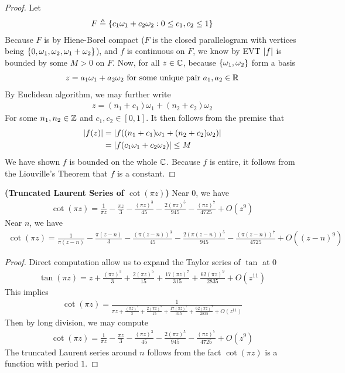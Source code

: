 \documentclass{report}
\begin{document}
\begin{proof}
Let 
\begin{align*}
F\triangleq  \{ c_1\omega_1+ c_2\omega_2: 0\leq c_1,c_2 \leq 1 \}
\end{align*}
Because $F$ is by Hiene-Borel compact ($F$ is the closed parallelogram with vertices being $\{ 0,\omega_1,\omega_2,\omega_1+\omega_2 \}$), and $f$ is continuous on $F$, we know by EVT $\left|f\right|$ is bounded  by some $M>0$ on  $F$. Now, for all $z\in\mathbb{C}$, because $\{ \omega_1,\omega_2 \}$ form a basis 
\begin{align*}
z=a_1\omega_1+a_2 \omega_2\text{ for some unique pair }a_1,a_2\in\mathbb{R}
\end{align*}
By Euclidean algorithm, we may further write 
\begin{align*}
z= (n_1+c_1)\omega_1 + (n_2+c_2)\omega_2
\end{align*}
For some $n_1,n_2 \in\mathbb{Z} $ and $c_1,c_2 \in [0,1]$. It then follows from the premise that 
\begin{align*}
  \left|f(z)\right|&=\left|f((n_1+c_1)\omega_1+ (n_2+c_2)\omega_2)\right| \\
             &=\left|f(c_1\omega_1+c_2\omega_2)\right|\leq M
\end{align*}
We have shown $f$ is bounded on the whole $\mathbb{C}$. Because $f$ is entire, it follows from the Liouville's Theorem that  $f$ is a constant.
\end{proof}
\begin{theorem}
\label{TL}
\textbf{(Truncated Laurent Series of $\cot (\pi  z)$)} Near $0$, we have 
\begin{align*}
\cot (\pi z)= \frac{1}{\pi  z}- \frac{\pi  z}{3}- \frac{(\pi  z)^3}{45}- \frac{2 (\pi z)^5}{945}- \frac{(\pi z)^7}{4725} + O(z^9)
\end{align*}
Near $n$, we have 
 \begin{align*}
\cot (\pi z)= \frac{1}{\pi (z-n)}- \frac{\pi  (z-n)}{3}- \frac{(\pi  (z-n))^3}{45}- \frac{2 (\pi (z-n))^5}{945}- \frac{(\pi (z-n))^7}{4725} + O((z-n)^9)
\end{align*}
\end{theorem}
\begin{proof}
Direct computation allow us to expand the Taylor series of $\tan$ at $0$ 
\begin{align*}
\tan(\pi z)=z+\frac{(\pi z)^3}{3}+\frac{2 (\pi  z)^5}{15}+\frac{17 (\pi z)^7}{315}+\frac{62
(\pi z)^9}{2835}+O\left(z^{11}\right)
\end{align*}
This implies 
\begin{align*}
  \cot(\pi z)=\frac 1{\pi z+\frac{(\pi  z)^3}{3}+\frac{2 (\pi  z)^5}{15}+\frac{17 (\pi z)^7}{315}+\frac{62 (\pi z)^9}{2835}+ O(z^{11})}
\end{align*}
Then by long division, we may compute 
\begin{align*}
\cot (\pi z)= \frac{1}{\pi  z}- \frac{\pi  z}{3}- \frac{(\pi  z)^3}{45}- \frac{2 (\pi z)^5}{945}- \frac{(\pi z)^7}{4725} + O(z^9)
\end{align*}
The truncated Laurent series around $n$ follows from the fact $\cot(\pi  z)$ is a function with period $1$.  
\end{proof}
\end{document}
